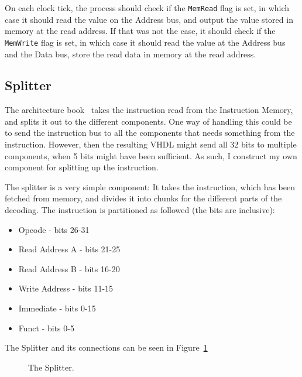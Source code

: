 On each clock tick, the process should check if the \texttt{MemRead} flag is
set, in which case it should read the value on the Address bus, and output the
value stored in memory at the read address. If that was not the case, it should
check if the \texttt{MemWrite} flag is set, in which case it should read the
value at the Address bus and the Data bus, store the read data in memory at the
read address.

\subsection{Splitter}
The architecture book~\cite{ref:ark} takes the instruction read from the
Instruction Memory, and splits it out to the different components. One way of
handling this could be to send the instruction bus to all the components that
needs something from the instruction. However, then the resulting VHDL might
send all 32 bits to multiple components, when 5 bits might have been
sufficient. As such, I construct my own component for splitting up the
instruction.

The splitter is a very simple component: It takes the instruction, which has
been fetched from memory, and divides it into chunks for the different parts of
the decoding. The instruction is partitioned as followed (the bits are
inclusive):
\begin{itemize}
    \item Opcode - bits 26-31
    \item Read Address A - bits 21-25
    \item Read Address B - bits 16-20
    \item Write Address - bits 11-15
    \item Immediate - bits 0-15
    \item Funct - bits 0-5
\end{itemize}
The Splitter and its connections can be seen in Figure~\ref{fig:split}
\begin{figure}
    \centering
    \caption{The Splitter.}
    \label{fig:split}
\end{figure}


